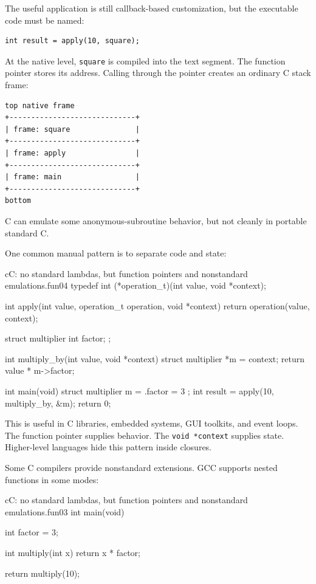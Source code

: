 \documentclass[a4paper,twoside]{report}
\begin{document}
The useful application is still callback-based customization, but the executable code must be named:

\begin{verbatim}
int result = apply(10, square);
\end{verbatim}

At the native level, \texttt{square} is compiled into the text segment. The function pointer stores its address. Calling through the pointer creates an ordinary C stack frame:

\begin{verbatim}
top native frame
+-----------------------------+
| frame: square               |
+-----------------------------+
| frame: apply                |
+-----------------------------+
| frame: main                 |
+-----------------------------+
bottom
\end{verbatim}

C can emulate some anonymous-subroutine behavior, but not cleanly in portable standard C.

One common manual pattern is to separate code and state:

\begin{codebox}[]{c}{C: no standard lambdas, but function pointers and nonstandard emulations.}{fun04}
typedef int (*operation_t)(int value, void *context);

int apply(int value, operation_t operation, void *context) {
    return operation(value, context);
}

struct multiplier {
    int factor;
};

int multiply_by(int value, void *context) {
    struct multiplier *m = context;
    return value * m->factor;
}

int main(void) {
    struct multiplier m = { .factor = 3 };
    int result = apply(10, multiply_by, &m);
    return 0;
}
\end{codebox}


This is useful in C libraries, embedded systems, GUI toolkits, and event loops. The function pointer supplies behavior. The \texttt{void *context} supplies state. Higher-level languages hide this pattern inside closures.

Some C compilers provide nonstandard extensions. GCC supports nested functions in some modes:

\begin{codebox}[]{c}{C: no standard lambdas, but function pointers and nonstandard emulations.}{fun03}
int main(void) {
    int factor = 3;

    int multiply(int x) {
        return x * factor;
    }

    return multiply(10);
}
\end{codebox}
\end{document}
